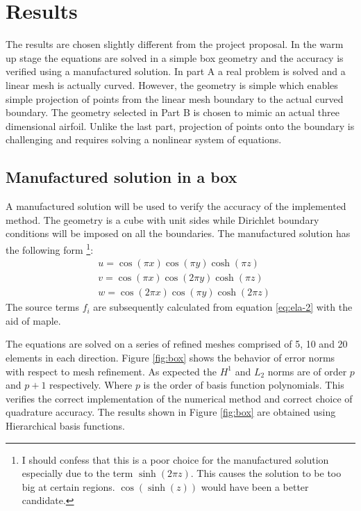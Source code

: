 \documentclass[letter,12pt]{article}
\begin{document}

\section{Results}

The results are chosen slightly different from the project
proposal. In the warm up stage the equations are solved in a simple
box geometry and the accuracy is verified using a manufactured
solution. In part A a real problem is solved and a linear mesh is
actually curved. However, the geometry is simple which enables simple
projection of points from the linear mesh boundary to the actual
curved boundary. The geometry selected in Part B is chosen to mimic an
actual three dimensional airfoil. Unlike the last part, projection of
points onto the boundary is challenging and requires solving a
nonlinear system of equations.

\subsection*{Manufactured solution in a box}

A manufactured solution will be used to verify the accuracy of the
implemented method. The geometry is a cube with unit sides while
Dirichlet boundary conditions will be imposed on all the boundaries.
The manufactured solution has the following form \footnote{I should
  confess that this is a poor choice for the manufactured solution
  especially due to the term $\sinh(2\pi z)$. This causes the solution
  to be too big at certain regions. $\cos(\sinh(z))$ would have been a
  better candidate. }:
%
\begin{align*}
& u = \cos(\pi x) \cos(\pi y) \cosh(\pi z) \\
& v = \cos(\pi x) \cos(2 \pi y) \cosh(\pi z) \\
& w = \cos(2 \pi x) \cos(\pi y) \cosh(2 \pi z) 
\end{align*}
%
The source terms $f_i$ are subsequently calculated from equation
\eqref{eq:ela-2} with the aid of maple. 

The equations are solved on a series of refined meshes comprised of 5,
10 and 20 elements in each direction. Figure \ref{fig:box} shows the
behavior of error norms with respect to mesh refinement. As expected
the $H^1$ and $L_2$ norms are of order $p$ and $p+1$
respectively. Where $p$ is the order of basis function
polynomials. This verifies the correct implementation of the numerical
method and correct choice of quadrature accuracy. The results shown in
Figure \ref{fig:box} are obtained using Hierarchical basis functions.
\end{document}
